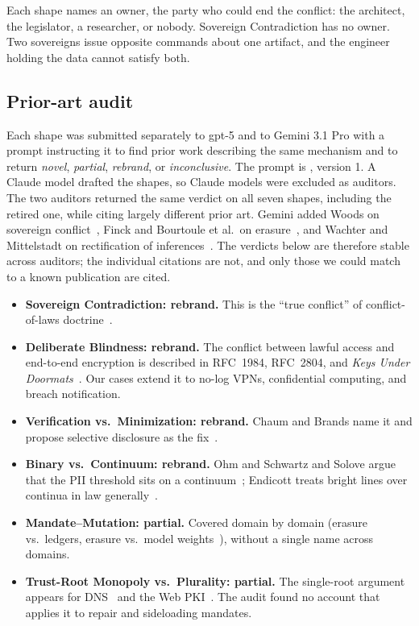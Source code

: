 \documentclass[10pt,twocolumn]{article}
\begin{document}
Each shape names an owner, the party who could end the conflict:
the architect, the legislator, a researcher, or nobody. Sovereign
Contradiction has no owner. Two sovereigns issue opposite commands about one
artifact, and the engineer holding the data cannot satisfy both.



\subsection{Prior-art audit}

Each shape was submitted separately to gpt-5 and to Gemini 3.1 Pro with a prompt instructing it to find prior
work describing the same mechanism and to return \emph{novel},
\emph{partial}, \emph{rebrand}, or \emph{inconclusive}. The prompt is
, version 1. A Claude model
drafted the shapes, so Claude models were excluded as auditors. The two
auditors returned the same verdict on all seven shapes, including the retired
one, while citing largely different prior art. Gemini added Woods on
sovereign conflict~\cite{woods2016}, Finck and Bourtoule et al.\ on
erasure~\cite{finck2018,bourtoule2021}, and Wachter and Mittelstadt on
rectification of inferences~\cite{wachter2019}. The verdicts below are therefore stable across auditors; the
individual citations are not, and only those we could match to a known
publication are cited.

\begin{itemize}
\item \textbf{Sovereign Contradiction: rebrand.} This is the ``true
  conflict'' of conflict-of-laws doctrine~\cite{hartfordfire,pauwelyn2003}.
\item \textbf{Deliberate Blindness: rebrand.} The conflict between lawful
  access and end-to-end encryption is described in RFC~1984, RFC~2804, and
  \emph{Keys Under Doormats}~\cite{rfc1984,rfc2804,abelson2015keys}. Our cases
  extend it to no-log VPNs, confidential computing, and breach notification.
\item \textbf{Verification vs.\ Minimization: rebrand.} Chaum and Brands name
  it and propose selective disclosure as the
  fix~\cite{chaum1985,brands2000}.
\item \textbf{Binary vs.\ Continuum: rebrand.} Ohm and Schwartz and Solove
  argue that the PII threshold sits on a continuum~\cite{ohm2010,schwartzsolove2011};
  Endicott treats bright lines over continua in law
  generally~\cite{endicott2000}.
\item \textbf{Mandate--Mutation: partial.} Covered domain by domain (erasure
  vs.\ ledgers, erasure vs.\ model weights~\cite{caoyang2015}), without a
  single name across domains.
\item \textbf{Trust-Root Monopoly vs.\ Plurality: partial.} The single-root
  argument appears for DNS~\cite{rfc2826} and the Web PKI~\cite{clark2013sok}.
  The audit found no account that applies it to repair and sideloading
  mandates.
\end{itemize}
\end{document}
